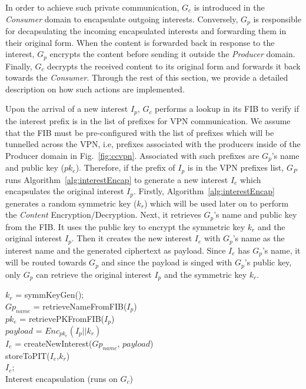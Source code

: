 In order to achieve such private communication, $G_c$ is introduced in the \textit{Consumer} domain
to encapsulate outgoing interests. Conversely, $G_p$ is responsible for decapsulating the incoming
encapsulated interests and forwarding them in their original form. When the content is forwarded back
in response to the interest, $G_p$ encrypts the content before sending it outside the \textit{Producer}
domain. Finally, $G_c$ decrypts the received content to its original form and forwards it back towards
the \textit{Consumer}. Through the rest of this section, we provide a detailed description on how
such actions are implemented.

Upon the arrival of a new interest $I_p$, $G_c$ performs a lookup in its FIB to verify if the interest
prefix is in the list of prefixes for VPN communication. We assume that the FIB must be pre-configured
with the list of prefixes which will be tunnelled across the VPN, i.e, prefixes associated with the
producers inside of the Producer domain in Fig.~\ref{fig:ccvpn}. Associated with such prefixes
are $G_p$'s name and public key ($pk_e$). Therefore, if the prefix of $I_p$ is in the VPN prefixes
list, $G_P$ runs Algorithm~\ref{alg:interestEncap} to generate a new interest $I_e$ which encapsulates
the original interest $I_p$. Firstly, Algorithm~\ref{alg:interestEncap} generates a random symmetric
key ($k_r$) which will be used later on to perform the \textit{Content} Encryption/Decryption. Next,
it retrieves $G_p$'s name and public key from the FIB. It uses the public key to encrypt the
symmetric key $k_r$ and the original interest $I_p$. Then it creates the new interest $I_e$ with
$G_p$'s name as the interest name and the generated ciphertext as payload. Since $I_e$ has $G_p$'s name,
it will be routed towards $G_p$ and since the payload is singed with $G_p$'s public key, only $G_p$
can retrieve the original interest $I_p$ and the symmetric key $k_r$.

\begin{algorithm}\label{alg:interestEncap}
$k_r$ = symmKeyGen();\\
$Gp_{name}$ = retrieveNameFromFIB($I_p$)\\
$pk_e$ = retrievePKFromFIB($I_p$)\\
$payload$ = $Enc_{pk_e}(I_p||k_r)$\\
$I_e$ = createNewInterest($Gp_{name}$, $payload$)\\
storeToPIT($I_e$,$k_r$)\\
\Return $I_e$;\\
\caption{Interest encapsulation (runs on $G_c$)}
\end{algorithm}

